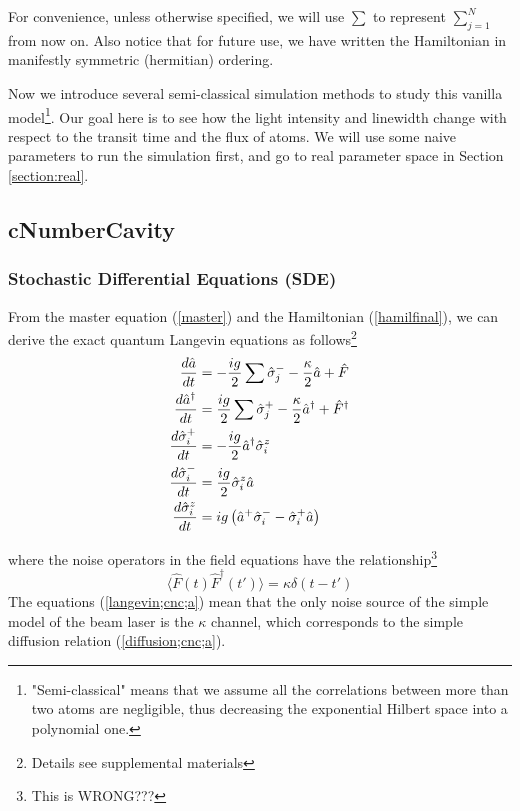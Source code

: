 \documentclass{article}
\begin{document}
For convenience, unless otherwise specified, we will use $\sum$ to represent $\sum_{j=1}^N$ from now on. Also notice that for future use, we have written the Hamiltonian in manifestly symmetric (hermitian) ordering. 

Now we introduce several semi-classical simulation methods to study this vanilla model\footnote{"Semi-classical" means that we assume all the correlations between more than two atoms are negligible, thus decreasing the exponential Hilbert space into a polynomial one.}. Our goal here is to see how the light intensity and linewidth change with respect to the transit time and the flux of atoms. We will use some naive parameters to run the simulation first, and go to real parameter space in Section \ref{section:real}.


\subsection{cNumberCavity}
\subsubsection{Stochastic Differential Equations (SDE)}
From the master equation (\ref{master}) and the Hamiltonian (\ref{hamilfinal}), we can derive the exact quantum Langevin equations as follows\footnote{Details see supplemental materials}
\begin{align}
\notag 
    \frac{d \hat{a}}{dt} &= -\frac{ig}{2}\sum\hat{\sigma}_j^--\frac{\kappa}{2}\hat{a}+\hat{F}\\\notag
    \frac{d \hat{a}^\dagger}{dt} &= \frac{ig}{2}\sum\hat{\sigma}_j^+-\frac{\kappa}{2}\hat{a}^\dagger+\hat{F}^{\dagger}\\
    \label{langevin;cnc;a}
    \frac{d \hat{\sigma}_i^+}{dt} &= -\frac{ig}{2}\hat{a}^\dagger\hat{\sigma}^z_i\\\notag
    \frac{d \hat{\sigma}_i^-}{dt} &= \frac{ig}{2}\hat{\sigma}^z_i\hat{a}\\\notag
    \frac{d \hat{\sigma}_i^z}{dt} &= ig\left(\hat{a}^+\hat{\sigma}^-_i-\hat{\sigma}_i^+\hat{a}\right)
\end{align}

where the noise operators in the field equations have the relationship\footnote{This is WRONG???}
\begin{equation}
\label{diffusion;cnc;a}
    \langle \hat{F}(t) \hat{F}^{\dagger}(t')\rangle = \kappa \delta (t-t')
\end{equation}
The equations (\ref{langevin;cnc;a}) mean that the only noise source of the simple model of the beam laser is the $\kappa$ channel, which corresponds to the simple diffusion relation (\ref{diffusion;cnc;a}).
\end{document}
